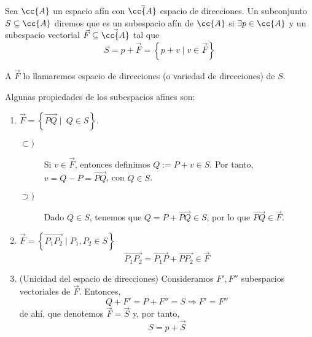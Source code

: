\begin{definicion}
    Sea $\cc{A}$ un espacio afín con $\vec{\cc{A}}$ espacio de direcciones.
    Un subconjunto $S\subseteq \cc{A}$ diremos que es un subespacio afín de $\cc{A}$ si $\exists p\in \cc{A}$
    y un subespacio vectorial $\vec{F}\subseteq \vec{\cc{A}}$ tal que $$S=p+\vec{F}=\left\{p+v\mid v\in \vec{F}\right\}$$

    A $\vec{F}$ lo llamaremos espacio de direcciones (o variedad de direcciones) de $S$.
\end{definicion}
Algunas propiedades de los subespacios afines son:
\begin{enumerate}
    \item $\vec{F}=\left\{\vec{PQ}\mid ~Q\in S\right\}$.
    \begin{description}
        \item[$\subset)$] Si $v\in \vec{F}$, entonces definimos $Q:=P+v\in S$. Por tanto, $v=Q-P=\vec{PQ}$, con $Q\in S$.

        \item[$\supset)$] Dado $Q\in S$, tenemos que $Q=P+\vec{PQ}\in S$, por lo que $\vec{PQ}\in \vec{F}$.
    \end{description}
    \item $\vec{F}=\left\{\vec{P_1P_2}\mid P_1,P_2\in S\right\}$
    $$\vec{P_1P_2} = \vec{P_1P} + \vec{PP_2}\in \vec{F}$$
    \item(Unicidad del espacio de direcciones) Consideramos $F', F''$ subespacios vectoriales de $\vec{F}$. Entonces,
    $$Q+F' = P+F'' = S \Longrightarrow F'=F''$$
    de ahí, que denotemos $\vec{F}=\vec{S}$ y, por tanto,
    $$S=p+\vec{S}$$
\end{enumerate}

